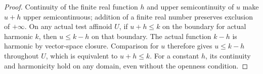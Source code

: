 \begin{proof}
Continuity of the finite real function $h$ and upper semicontinuity of $u$
make $u+h$ upper semicontinuous; addition of a finite real number preserves
exclusion of $+\infty$. On any actual test affinoid $U$, if $u+h\le k$ on
the boundary for actual harmonic $k$, then $u\le k-h$ on that boundary.
The actual function $k-h$ is harmonic by vector-space closure. Comparison
for $u$ therefore gives $u\le k-h$ throughout $U$, which is equivalent to
$u+h\le k$. For a constant $h$, its continuity and harmonicity hold on any
domain, even without the openness condition.
\end{proof}
